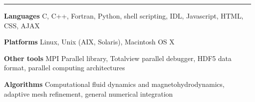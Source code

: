 
\rule[3pt]{321.38208pt}{.1mm}

\bigskip
\noindent
{\bf Languages} C, C++, Fortran, Python, shell scripting,
IDL,  Javascript, HTML, CSS, AJAX

\medskip
\noindent
{\bf Platforms} Linux, Unix (AIX, Solaris), Macintosh OS X

\medskip
\noindent
{\bf Other tools} MPI Parallel library, Totalview parallel debugger,
HDF5 data format, parallel computing architectures

\medskip
\noindent
{\bf Algorithms} Computational fluid dynamics and magnetohydrodynamics, adaptive mesh
refinement, general numerical integration

\bigskip
\bigskip

\vfill


